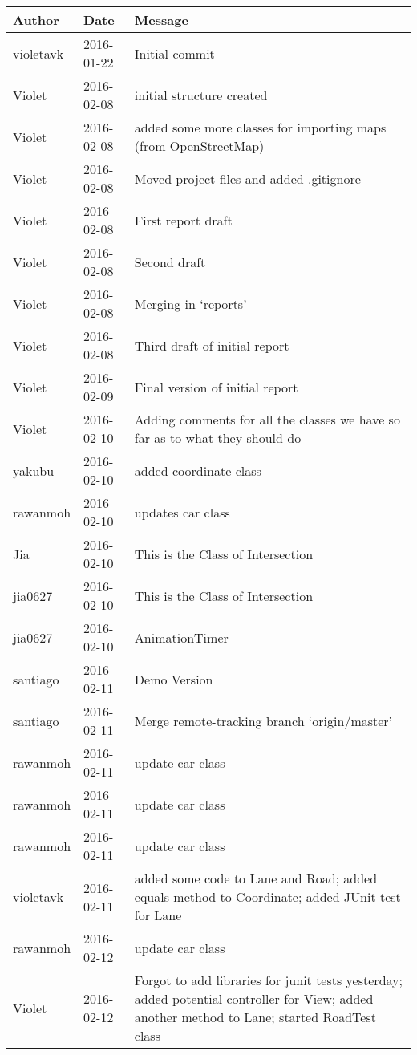 \begin{center}
\begin{longtabu} to \textwidth {|
    X[4,l]|
    X[3,c]|
    X[8,l]|}
    \hline
    \textbf{Author} & \textbf{Date} & \textbf{Message} \\ \hline
violetavk & 2016-01-22 & Initial commit \\ \hline
Violet & 2016-02-08 & initial structure created \\ \hline
Violet & 2016-02-08 & added some more classes for importing maps (from OpenStreetMap) \\ \hline
Violet & 2016-02-08 & Moved project files and added .gitignore \\ \hline
Violet & 2016-02-08 & First report draft \\ \hline
Violet & 2016-02-08 & Second draft \\ \hline
Violet & 2016-02-08 & Merging in `reports' \\ \hline
Violet & 2016-02-08 & Third draft of initial report \\ \hline
Violet & 2016-02-09 & Final version of initial report \\ \hline
Violet & 2016-02-10 & Adding comments for all the classes we have so far as to what they should do \\ \hline
yakubu & 2016-02-10 & added coordinate class \\ \hline
rawanmoh & 2016-02-10 & updates car class \\ \hline
Jia & 2016-02-10 & This is the Class of Intersection \\ \hline
jia0627 & 2016-02-10 & This is the Class of Intersection \\ \hline
jia0627 & 2016-02-10 & AnimationTimer \\ \hline
santiago & 2016-02-11 & Demo Version \\ \hline
santiago & 2016-02-11 & Merge remote-tracking branch `origin/master' \\ \hline
rawanmoh & 2016-02-11 & update car class \\ \hline
rawanmoh & 2016-02-11 & update car class \\ \hline
rawanmoh & 2016-02-11 & update car class \\ \hline
violetavk & 2016-02-11 & added some code to Lane and Road; added equals method to Coordinate; added JUnit test for Lane \\ \hline
rawanmoh & 2016-02-12 & update car class \\ \hline
Violet & 2016-02-12 & Forgot to add libraries for junit tests yesterday; added potential controller for View; added another method to Lane; started RoadTest class \\ \hline

\end{longtabu}
\end{center}
